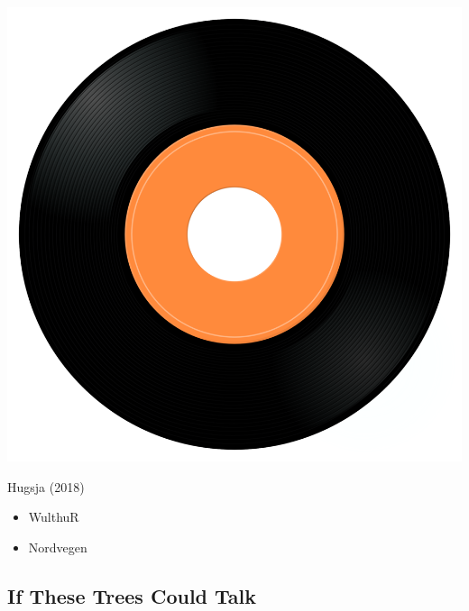 \begin{minipage}[t]{0.25\textwidth}\vspace{0pt}
\captionsetup{type=figure}
\includegraphics[width=\textwidth]{Images/cover.png}
\caption*{Hugsja (2018)}
\end{minipage}
\begin{minipage}[t]{0.25\textwidth}\vspace{0pt}
\begin{itemize}[nosep,leftmargin=1em,labelwidth=*,align=left]
	\setlength{\itemsep}{0pt}
	\item WulthuR
	\item Nordvegen
\end{itemize}
\end{minipage}

\subsection{If These Trees Could Talk}

